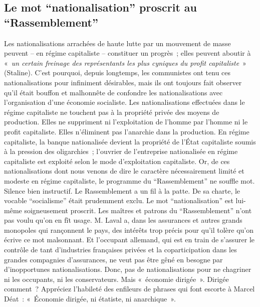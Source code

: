 \documentclass[french,twoside]{book} %
\begin{document}
\subsection[Le mot “nationalisation” proscrit au “Rassemblement”]{Le mot “nationalisation” proscrit au “Rassemblement”}
\noindent Les nationalisations arrachées de haute lutte par un mouvement de masse peuvent – en régime capitaliste – constituer un progrès ; elles peuvent aboutir à « \emph{un certain freinage des représentants les plus cyniques du profit capitaliste} » (Staline). C’est pourquoi, depuis longtemps, les communistes ont tenu ces nationalisations pour infiniment désirables, mais ils ont toujours fait observer qu’il était bouffon et malhonnête de confondre les nationalisations avec l’organisation d’une économie socialiste. Les nationalisations effectuées dans le régime capitaliste ne touchent pas à la propriété privée des moyens de production. Elles ne suppriment ni l’exploitation de l’homme par l’homme ni le profit capitaliste. Elles n’éliminent pas l’anarchie dans la production. En régime capitaliste, la banque nationalisée devient la propriété de l’État capitaliste soumis à la pression des oligarchies ; l’ouvrier de l’entreprise nationalisée en régime capitaliste est exploité selon le mode d’exploitation capitaliste. Or, de ces nationalisations dont nous venons de dire le caractère nécessairement limité et modeste en régime capitaliste, le programme du “Rassemblement” ne souffle mot. Silence bien instructif. Le Rassemblement a un fil à la patte. De sa charte, le vocable “socialisme” était prudemment exclu. Le mot “nationalisation” est lui-même soigneusement proscrit. Les maîtres et patrons du “Rassemblement” n’ont pas voulu qu’on en fît usage. M. Laval a, dans les assurances et autres grands monopoles qui rançonnent le pays, des intérêts trop précis pour qu’il tolère qu’on écrive ce mot malsonnant. Et l’occupant allemand, qui est en train de s’assurer le contrôle de tant d’industries françaises privées et la coparticipation dans les grandes compagnies d’assurances, ne veut pas être gêné en besogne par d’inopportunes nationalisations. Donc, pas de nationalisations pour ne chagriner ni les occupants, ni les conservateurs. Mais « économie dirigée ». Dirigée comment ? Appréciez l’habileté des enfileurs de phrases qui font escorte à Marcel Déat : « Économie dirigée, ni étatiste, ni anarchique ».
\end{document}
